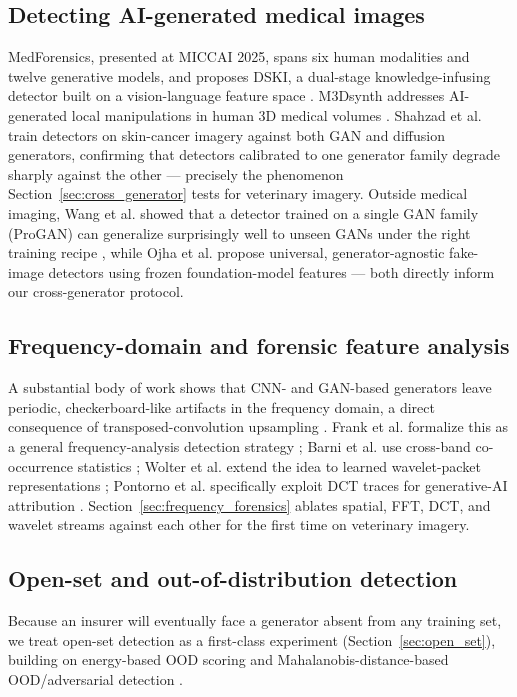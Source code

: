 \documentclass[journal]{IEEEtran}
\begin{document}
\subsection{Detecting AI-generated medical images}
MedForensics, presented at MICCAI 2025, spans six human modalities and twelve generative models, and proposes DSKI, a dual-stage knowledge-infusing detector built on a vision-language feature space \cite{medforensics2025}. M3Dsynth addresses AI-generated local manipulations in human 3D medical volumes \cite{m3dsynth2023}. Shahzad et al. train detectors on skin-cancer imagery against both GAN and diffusion generators, confirming that detectors calibrated to one generator family degrade sharply against the other \cite{hybrid_gan_diffusion_2026} — precisely the phenomenon Section~\ref{sec:cross_generator} tests for veterinary imagery. Outside medical imaging, Wang et al. showed that a detector trained on a single GAN family (ProGAN) can generalize surprisingly well to unseen GANs under the right training recipe \cite{cnngen_easy_2020}, while Ojha et al. propose universal, generator-agnostic fake-image detectors using frozen foundation-model features \cite{universal_detector_2023} — both directly inform our cross-generator protocol.

\subsection{Frequency-domain and forensic feature analysis}
A substantial body of work shows that CNN- and GAN-based generators leave periodic, checkerboard-like artifacts in the frequency domain, a direct consequence of transposed-convolution upsampling \cite{frequency_checkerboard_2021}. Frank et al. formalize this as a general frequency-analysis detection strategy \cite{freq_analysis_2020}; Barni et al. use cross-band co-occurrence statistics \cite{cross_band_2020}; Wolter et al. extend the idea to learned wavelet-packet representations \cite{wavelet_deepfake_2022}; Pontorno et al. specifically exploit DCT traces for generative-AI attribution \cite{dct_traces_2024}. Section~\ref{sec:frequency_forensics} ablates spatial, FFT, DCT, and wavelet streams against each other for the first time on veterinary imagery.

\subsection{Open-set and out-of-distribution detection}
Because an insurer will eventually face a generator absent from any training set, we treat open-set detection as a first-class experiment (Section~\ref{sec:open_set}), building on energy-based OOD scoring \cite{energy_ood_2020} and Mahalanobis-distance-based OOD/adversarial detection \cite{mahalanobis_ood_2018}.
\end{document}
